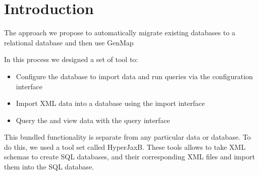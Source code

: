 \section{Introduction}
  The approach we propose to automatically migrate existing databases to a relational database and then use GenMap
  \par
 	In this process we designed a set of tool to: 
 \begin{itemize}
	\item {Configure the database to import data and run queries via the configuration interface}
	\item {Import XML data into a database using the import interface}
	\item {Query the and view data with the query interface}
\end{itemize}
	This bundled functionality is separate from any particular data or database. To do this, we used a tool set called HyperJaxB. These tools allows to take XML schemas to create SQL databases, and their corresponding XML files and import them into the SQL database. 
